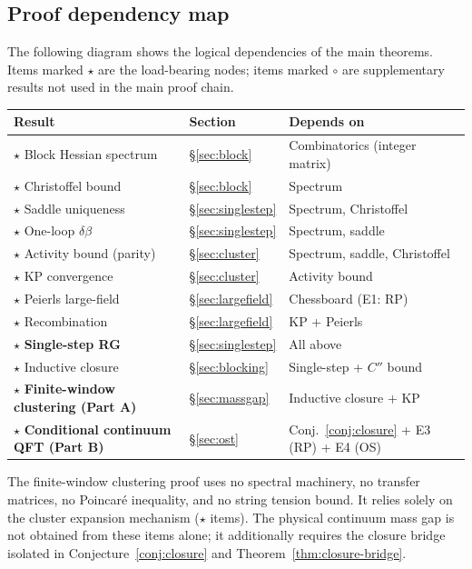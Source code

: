 \documentclass[11pt]{article}
\theoremstyle{definition}
\begin{document}
\subsection{Proof dependency map}\label{subsec:proofmap}

The following diagram shows the logical dependencies of the main
theorems.  Items marked $\star$ are the load-bearing nodes;
items marked $\circ$ are supplementary results not used in the
main proof chain.

\begin{center}
\renewcommand{\arraystretch}{1.3}
\begin{tabular}{@{}p{5.5cm}p{2.5cm}p{5.5cm}@{}}
\toprule
\textbf{Result} & \textbf{Section} & \textbf{Depends on} \\
\midrule
$\star$ Block Hessian spectrum
  & \S\ref{sec:block} & Combinatorics (integer matrix) \\
$\star$ Christoffel bound
  & \S\ref{sec:block} & Spectrum \\
$\star$ Saddle uniqueness
  & \S\ref{sec:singlestep} & Spectrum, Christoffel \\
$\star$ One-loop $\delta\beta$
  & \S\ref{sec:singlestep} & Spectrum, saddle \\
$\star$ Activity bound (parity)
  & \S\ref{sec:cluster} & Spectrum, saddle, Christoffel \\
$\star$ KP convergence
  & \S\ref{sec:cluster} & Activity bound \\
$\star$ Peierls large-field
  & \S\ref{sec:largefield} & Chessboard (E1: RP) \\
$\star$ Recombination
  & \S\ref{sec:largefield} & KP + Peierls \\
$\star$ \textbf{Single-step RG}
  & \S\ref{sec:singlestep} & All above \\
$\star$ Inductive closure
  & \S\ref{sec:blocking} & Single-step + $C''$ bound \\
$\star$ \textbf{Finite-window clustering (Part A)}
  & \S\ref{sec:massgap} & Inductive closure + KP \\
$\star$ \textbf{Conditional continuum QFT (Part B)}
  & \S\ref{sec:ost} & Conj.~\ref{conj:closure} + E3 (RP) + E4 (OS) \\
\bottomrule
\end{tabular}
\end{center}

\noindent
The finite-window clustering proof uses no spectral machinery,
no transfer matrices, no Poincar\'e inequality,
and no string tension bound.  It relies solely on the cluster expansion
mechanism ($\star$ items).  The physical continuum mass gap is not
obtained from these items alone; it additionally requires the closure
bridge isolated in Conjecture~\ref{conj:closure} and
Theorem~\ref{thm:closure-bridge}.
\end{document}
